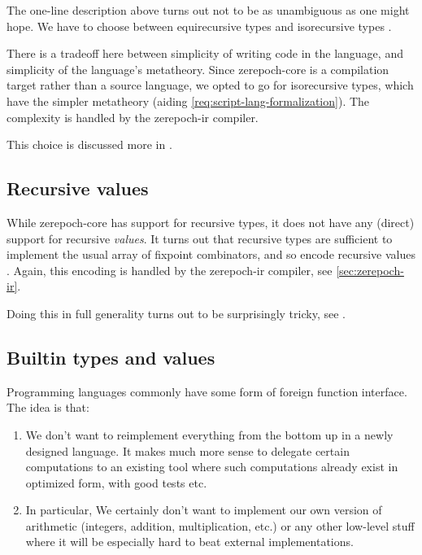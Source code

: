 The one-line description above turns out not to be as unambiguous as one might hope. We have
to choose between equirecursive types and isorecursive types \autocite[chapter 21]{pierce2002types}.

There is a tradeoff here between simplicity of writing code in the language, and simplicity of the language's metatheory.
Since \gls{zerepoch-core} is a compilation target rather than a source language, we opted to go for isorecursive types, which have the simpler metatheory (aiding \cref{req:script-lang-formalization}).
The complexity is handled by the \gls{zerepoch-ir} compiler.

This choice is discussed more in \textcite{zerepoch-core-spec, peytonjones2019unraveling}.

\subsection{Recursive values}

While \gls{zerepoch-core} has support for recursive types, it does not have any (direct) support for recursive \emph{values}.
It turns out that recursive types are sufficient to implement the usual array of fixpoint combinators, and so encode recursive values \autocite{harper2012practical}.
Again, this encoding is handled by the \gls{zerepoch-ir} compiler, see \cref{sec:zerepoch-ir}.

Doing this in full generality turns out to be surprisingly tricky, see \textcite{peytonjones2019unraveling}.

\subsection{Builtin types and values}

Programming languages commonly have some form of foreign function interface. The idea is that:

\begin{enumerate}
\item
  We don't want to reimplement everything from the bottom up in a newly designed language.
  It makes much more sense to delegate certain computations to an existing tool where such computations already exist in optimized form, with good tests etc.
\item
  In particular, We certainly don't want to implement our own version of arithmetic (integers, addition, multiplication, etc.) or any other low-level stuff where it will be especially hard to beat external implementations.
\end{enumerate}

